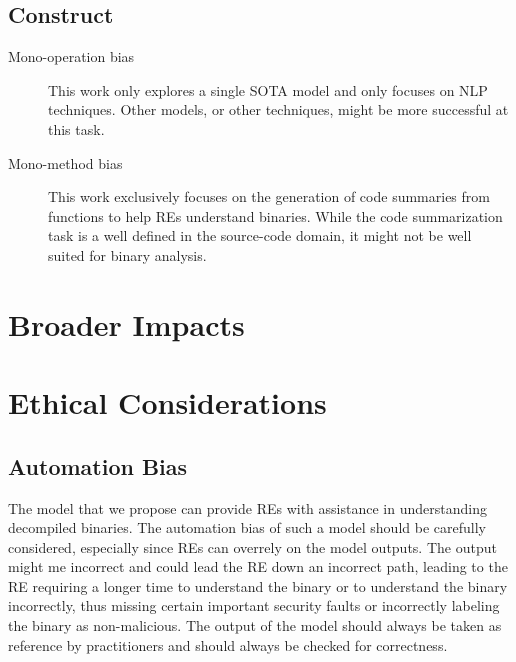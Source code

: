 \subsection{Construct}
    \begin{description}
        \item[Mono-operation bias] This work only explores a single SOTA model and only focuses on NLP techniques. Other models, or other techniques, might be more successful at this task.
        \item[Mono-method bias] This work exclusively focuses on the generation of code summaries from functions to help REs understand binaries. While the code summarization task is a well defined in the source-code domain, it might not be well suited for binary analysis.
    \end{description}


\section{Broader Impacts}


\section{Ethical Considerations}
\subsection{Automation Bias}
The model that we propose can provide REs with assistance in understanding decompiled binaries. The automation bias of such a model should be carefully considered, especially since REs can overrely on the model outputs. The output might me incorrect and could lead the RE down an incorrect path, leading to the RE requiring a longer time to understand the binary or to understand the binary incorrectly, thus missing certain important security faults or incorrectly labeling the binary as non-malicious. The output of the model should always be taken as reference by practitioners and should always be checked for correctness.


